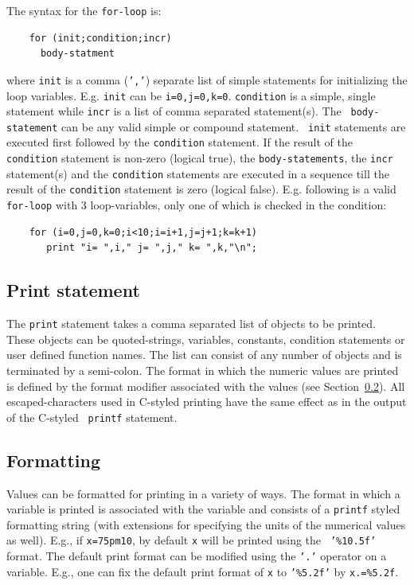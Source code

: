 \documentclass[12pt]{article}
\begin{document}
The syntax for the {\tt for-loop} is:
\begin{verbatim}
    for (init;condition;incr)
      body-statment
\end{verbatim}
where {\tt init} is a comma ({\tt ','}) separate list of simple
statements for initializing the loop variables.  E.g. {\tt init} can
be {\tt i=0,j=0,k=0}. {\tt condition} is a simple, single statement
while {\tt incr} is a list of comma separated statement(s). The {\tt
body-statement} can be any valid simple or compound statement.  {\tt
init} statements are executed first followed by the {\tt condition}
statement.  If the result of the {\tt condition} statement is non-zero
(logical true), the {\tt body-statements}, the {\tt incr} statement(s)
and the {\tt condition} statements are executed in a sequence till the
result of the {\tt condition} statement is zero (logical false).
E.g. following is a valid {\tt for-loop} with 3 loop-variables, only
one of which is checked in the condition:
\begin{verbatim}
    for (i=0,j=0,k=0;i<10;i=i+1,j=j+1;k=k+1) 
       print "i= ",i," j= ",j," k= ",k,"\n";
\end{verbatim}

\subsection{Print statement}
\label{PRINT}

The {\tt print} statement takes a comma separated list of objects to
be printed.  These objects can be quoted-strings, variables,
constants, condition statements or user defined function names.  The
list can consist of any number of objects and is terminated by a
semi-colon.  The format in which the numeric values are printed is
defined by the format modifier associated with the values (see
Section~\ref{FORMATTING}).  All escaped-characters used in C-styled
printing have the same effect as in the output of the C-styled {\tt
printf} statement.

\subsection{Formatting}
\label{FORMATTING}

Values can be formatted for printing in a variety of ways.  The format
in which a variable is printed is associated with the variable and
consists of a {\tt printf} styled formatting string (with extensions
for specifying the units of the numerical values as well).  E.g., if
{\tt x=75pm10}, by default {\tt x} will be printed using the {\tt
'\%10.5f'} format.  The default print format can be modified using the
{\tt '.'} operator on a variable.  E.g., one can fix the default print
format of {\tt x} to {\tt '\%5.2f'} by {\tt x.=\%5.2f}.
\end{document}
